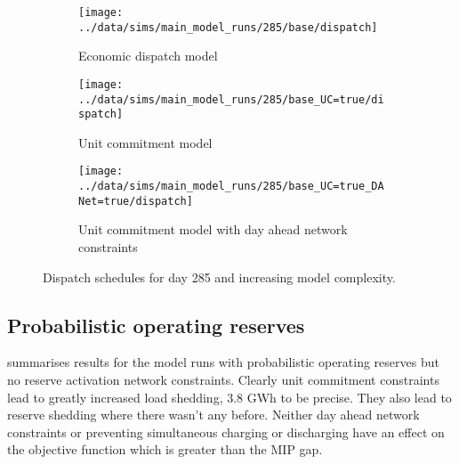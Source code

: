 \documentclass[number,times]{elsarticle}
\begin{document}
\begin{figure}[H]
    \centering
    \begin{subfigure}[t]{0.7\textwidth}
        \centering
        \texttt{[image: ../data/sims/main\_model\_runs/285/base/dispatch]}
        \caption{Economic dispatch model}
    \end{subfigure}
    \begin{subfigure}[t]{0.7\textwidth}
        \centering
        \texttt{[image: ../data/sims/main\_model\_runs/285/base\_UC=true/dispatch]}
        \caption{Unit commitment model}
    \end{subfigure}
    \begin{subfigure}[t]{0.7\textwidth}
        \centering
        \texttt{[image: ../data/sims/main\_model\_runs/285/base\_UC=true\_DANet=true/dispatch]}
        \caption{Unit commitment model with day ahead network constraints}
    \end{subfigure}
    \caption{Dispatch schedules for day 285 and increasing model complexity.\label{fig:dispatch_base}}
\end{figure}

\subsection{Probabilistic operating reserves}

 summarises results for the model runs with probabilistic operating reserves but no reserve activation network constraints. Clearly unit commitment constraints lead to greatly increased load shedding, 3.8 GWh to be precise. They also lead to reserve shedding where there wasn't any before. Neither day ahead network constraints or preventing simultaneous charging or discharging have an effect on the objective function which is greater than the MIP gap.
\end{document}
